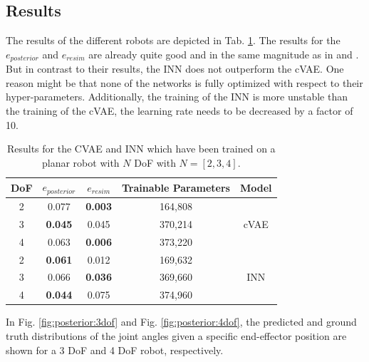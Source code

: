 \documentclass[conference]{IEEEtran}
\begin{document}
\subsection*{Results}

The results of the different robots are depicted in Tab. \ref{tab:results}. The results for the $e_{posterior}$ and $e_{resim}$ are already quite good and in the same magnitude as in  \cite{Ardizzone2018} and \cite{Kruse2019}. But in contrast to their results, the INN does not outperform the cVAE. One reason might be that none of the networks is fully optimized with respect to their hyper-parameters. Additionally, the training of the INN is more unstable than the training of the cVAE, the learning rate needs to be decreased by a factor of 10. 
\begin{table}[h]
\centering
\begin{tabular}{|c|c|c|c|c|}
\hline
 DoF & $e_{posterior}$ & $e_{resim}$ & Trainable Parameters & Model \\
 \hline
 2  & 0.077 & \textbf{0.003} & 164,808 & \\
 3  & \textbf{0.045} & 0.045 & 370,214 & cVAE \\
 4  & 0.063 & \textbf{0.006} & 373,220 & \\
 \hline
 2  & \textbf{0.061} & 0.012 & 169,632 & \\
 3  & 0.066 & \textbf{0.036} & 369,660 & INN \\
 4  & \textbf{0.044} & 0.075 & 374,960 & \\
 \hline
\end{tabular}
\vspace{5pt}
\caption{\label{tab:results} Results for the CVAE and INN which have been trained on a planar robot with $N$ DoF with $N=[2, 3, 4]$.}
\end{table}
In Fig. \ref{fig:posterior:3dof} and Fig. \ref{fig:posterior:4dof}, the predicted and ground truth distributions of the joint angles given a specific end-effector position are shown for a 3 DoF and 4 DoF robot, respectively.
\end{document}
